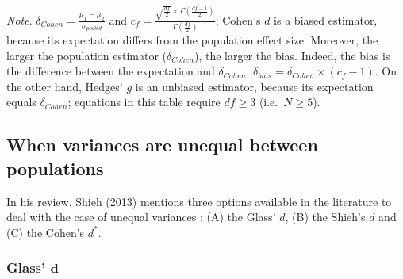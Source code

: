 \documentclass[
  english,
  man,floatsintext]{apa6}
\begin{document}
\begin{landscape}
\emph{Note}. \(\delta_{Cohen}= \frac{\mu_1-\mu_2}{\sigma_{pooled}}\) and \(c_f=\frac{\sqrt{\frac{df}{2}} \times \Gamma\left( \frac{df-1}{2}\right)}{\Gamma\left( \frac{df}{2}\right)}\); Cohen's \(d\) is a biased estimator, because its expectation differs from the population effect size. Moreover, the larger the population estimator (\(\delta_{Cohen}\)), the larger the bias. Indeed, the bias is the difference between the expectation and \(\delta_{Cohen}\): \(\delta_{bias} = \delta_{Cohen} \times (c_f-1)\). On the other hand, Hedges' \(g\) is an unbiased estimator, because its expectation equals \(\delta_{Cohen}\); equations in this table require \(df \ge 3\) (i.e.~\(N \ge 5\)).

\end{landscape}

\hypertarget{when-variances-are-unequal-between-populations}{%
\subsection{When variances are unequal between populations}\label{when-variances-are-unequal-between-populations}}

In his review, Shieh (2013) mentions three options available in the literature to deal with the case of unequal variances : (A) the Glass' \(d\), (B) the Shieh's \(d\) and (C) the Cohen's \(d^*\).

\hypertarget{glass-bmd}{%
\subsubsection{\texorpdfstring{Glass' \(\bm{d}\)}{Glass' \textbackslash bm\{d\}}}\label{glass-bmd}}
\end{document}
